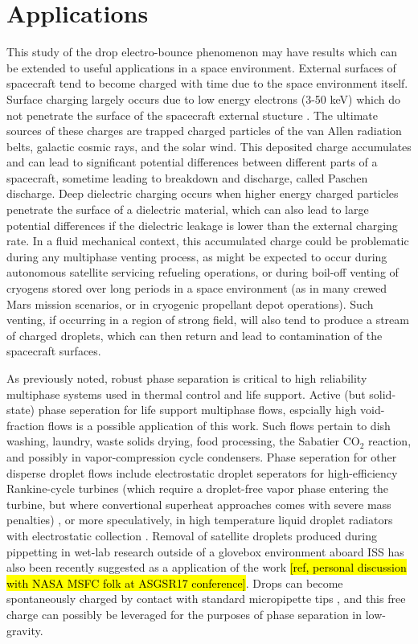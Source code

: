 \documentclass[12pt,a4paper,oneside]{book}
\begin{document}
\section{Applications}
This study of the drop electro-bounce phenomenon may have results which can be extended to useful applications in a space environment. External surfaces of spacecraft tend to become charged with time due to the space environment itself. Surface charging largely occurs due to low energy electrons (3-50 keV) which do not penetrate the surface of the spacecraft external stucture \cite{czepiela_charging_1997}. The ultimate sources of these charges are trapped charged particles of the van Allen radiation belts, galactic cosmic rays, and the solar wind. This deposited charge accumulates and can lead to significant potential differences between different parts of a spacecraft, sometime leading to breakdown and discharge, called Paschen discharge. Deep dielectric charging occurs when higher energy charged particles penetrate the surface of a dielectric material, which can also lead to large potential differences if the dielectric leakage is lower than the external charging rate. In a fluid mechanical context, this accumulated charge could be problematic during any multiphase venting process, as might be expected to occur during autonomous satellite servicing refueling operations, or during boil-off venting of cryogens stored over long periods in a space environment (as in many crewed Mars mission scenarios, or in cryogenic propellant depot operations). Such venting, if occurring in a region of strong field, will also tend to produce a stream of charged droplets, which can then return and lead to contamination of the spacecraft surfaces.

As previously noted, robust phase separation is critical to high reliability multiphase systems used in thermal control and life support. Active (but solid-state) phase seperation for life support multiphase flows, espcially high void-fraction flows is a possible application of this work. Such flows pertain to dish washing, laundry, waste solids drying, food processing, the Sabatier CO$_2$ reaction, and possibly in vapor-compression cycle condensers. Phase seperation for other disperse droplet flows include electrostatic droplet seperators for high-efficiency Rankine-cycle turbines (which require a droplet-free vapor phase entering the turbine, but where convertional superheat approaches comes with severe mass penalties) \cite{unterberg_zero_1962}, or more speculatively, in high temperature liquid droplet radiators with electrostatic collection \cite{white_liquid_1987}. Removal of satellite droplets produced during pippetting in wet-lab research outside of a glovebox environment aboard ISS has also been recently suggested as a application of the work \hl{[ref, personal discussion with NASA MSFC folk at ASGSR17 conference]}. Drops can become spontaneously charged by contact with standard micropipette tips \cite{choi_spontaneous_2013}, and this free charge can possibly be leveraged for the purposes of phase separation in low-gravity. 
\end{document}
